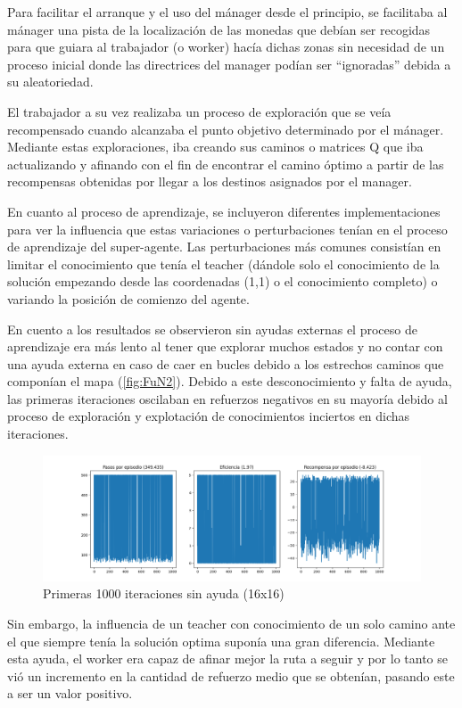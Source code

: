 \documentclass[letterpaper]{article} %
\begin{document}
Para facilitar el arranque y el uso del mánager desde el principio, se facilitaba al mánager una pista de la localización de las monedas que 
debían ser recogidas para que guiara al trabajador (o worker) hacía dichas zonas sin necesidad de un proceso inicial donde las directrices del
manager podían ser “ignoradas” debida a su aleatoriedad. 

El trabajador a su vez realizaba un proceso de exploración que se veía recompensado cuando alcanzaba el punto objetivo determinado por el mánager.
Mediante estas exploraciones, iba creando sus caminos o matrices Q que iba actualizando y afinando con el fin de encontrar el camino óptimo a
partir de las recompensas obtenidas por llegar a los destinos asignados por el manager.

En cuanto al proceso de aprendizaje, se incluyeron diferentes implementaciones para ver la influencia que estas variaciones o perturbaciones
tenían en el proceso de aprendizaje del super-agente. Las perturbaciones más comunes consistían en limitar el conocimiento que tenía el 
teacher (dándole solo el conocimiento de la solución empezando desde las coordenadas (1,1) o el conocimiento completo) o variando la posición
de comienzo del agente.


En cuento a los resultados se observieron sin ayudas externas el proceso de aprendizaje era más lento al tener que explorar muchos estados y
 no contar con una ayuda externa en caso de caer en bucles debido a los estrechos caminos que componían el mapa (\ref{fig:FuN2}). Debido
  a este desconocimiento y falta de ayuda, las primeras iteraciones oscilaban en refuerzos negativos en su mayoría debido al proceso de exploración
   y explotación de conocimientos inciertos en dichas iteraciones. 

\begin{figure}[H]
    \centering
    \includegraphics[width=0.9\columnwidth]{sin_ayuda_externa.png}
    \caption{Primeras 1000 iteraciones sin ayuda (16x16)\label{fig:FuN1}}
\end{figure}

Sin embargo, la influencia de un teacher con conocimiento de un solo camino ante el que siempre tenía la solución optima suponía una gran diferencia.
 Mediante esta ayuda, el worker era capaz de afinar mejor la ruta a seguir y por lo tanto se vió un incremento en la cantidad de refuerzo medio que 
 se obtenían, pasando este a ser un valor positivo.
\end{document}

